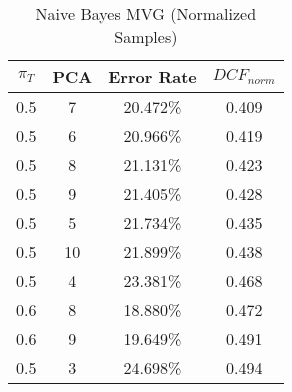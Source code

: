 \begin{longtable}{|c|c|c|c|}
\caption{Naive Bayes MVG (Normalized Samples)}\label{tab:mvgn_naiveacctable}\\
\hline
$\pi_T$ & PCA & Error Rate & $DCF_{norm}$\\
\hline
0.5 & 7 & 20.472\% & 0.409\\
\hline
0.5 & 6 & 20.966\% & 0.419\\
\hline
0.5 & 8 & 21.131\% & 0.423\\
\hline
0.5 & 9 & 21.405\% & 0.428\\
\hline
0.5 & 5 & 21.734\% & 0.435\\
\hline
0.5 & 10 & 21.899\% & 0.438\\
\hline
0.5 & 4 & 23.381\% & 0.468\\
\hline
0.6 & 8 & 18.880\% & 0.472\\
\hline
0.6 & 9 & 19.649\% & 0.491\\
\hline
0.5 & 3 & 24.698\% & 0.494\\
\hline
\end{longtable}
